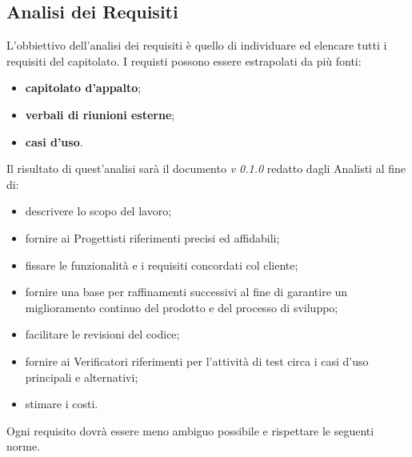 \documentclass[NormeDiProgetto.tex]{subfiles}
\begin{document}
\subsection{Analisi dei Requisiti}
L'obbiettivo dell'analisi dei requisiti è quello di individuare ed elencare tutti i requisiti del capitolato. I requisti possono essere estrapolati da più fonti:
\begin{itemize}
	\item \textbf{capitolato d’appalto};
	\item \textbf{verbali di riunioni esterne};
	\item \textbf{casi d’uso}.
\end{itemize}
Il risultato di quest'analisi sarà il documento \textit{\adr v 0.1.0} redatto dagli Analisti al
fine di:
\begin{itemize}
\item descrivere lo scopo del lavoro;
\item fornire ai Progettisti riferimenti precisi ed affidabili;
\item fissare le funzionalità e i requisiti concordati col cliente;
\item fornire una base per raffinamenti successivi al fine di garantire un
miglioramento continuo del prodotto e del processo di sviluppo;
\item facilitare le revisioni del codice;
\item fornire ai Verificatori riferimenti per l’attività di test circa i casi d’uso
principali e alternativi;
\item stimare i costi.
\end{itemize}
Ogni requisito dovrà
essere meno ambiguo possibile e rispettare le seguenti norme.
\end{document}
